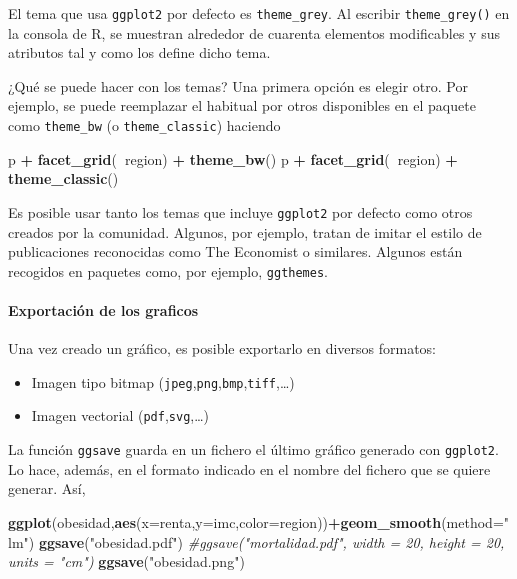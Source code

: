 \documentclass[]{article}
\newenvironment{Shaded}{\begin{snugshade}}{\end{snugshade}}
\newcommand{\CommentTok}[1]{\textcolor[rgb]{0.56,0.35,0.01}{\textit{#1}}}
\newcommand{\DataTypeTok}[1]{\textcolor[rgb]{0.13,0.29,0.53}{#1}}
\newcommand{\KeywordTok}[1]{\textcolor[rgb]{0.13,0.29,0.53}{\textbf{#1}}}
\newcommand{\NormalTok}[1]{#1}
\newcommand{\OperatorTok}[1]{\textcolor[rgb]{0.81,0.36,0.00}{\textbf{#1}}}
\newcommand{\StringTok}[1]{\textcolor[rgb]{0.31,0.60,0.02}{#1}}
\providecommand{\tightlist}{%
  \setlength{\itemsep}{0pt}\setlength{\parskip}{0pt}}
\let\oldparagraph\paragraph
\renewcommand{\paragraph}[1]{\oldparagraph{#1}\mbox{}}
\numberwithin{ejcnt}{section}
\begin{document}
El tema que usa \texttt{ggplot2} por defecto es \texttt{theme\_grey}. Al escribir \texttt{theme\_grey()} en la consola de R, se muestran alrededor de cuarenta elementos modificables y sus atributos tal y como los define dicho tema.

¿Qué se puede hacer con los temas? Una primera opción es elegir otro. Por ejemplo, se puede reemplazar el habitual por otros disponibles en el paquete como \texttt{theme\_bw} (o \texttt{theme\_classic}) haciendo

\begin{Shaded}
\begin{Highlighting}[]
\NormalTok{p }\OperatorTok{+}\StringTok{ }\KeywordTok{facet_grid}\NormalTok{(}\OperatorTok{~}\NormalTok{region) }\OperatorTok{+}\StringTok{ }\KeywordTok{theme_bw}\NormalTok{()}
\NormalTok{p }\OperatorTok{+}\StringTok{ }\KeywordTok{facet_grid}\NormalTok{(}\OperatorTok{~}\NormalTok{region) }\OperatorTok{+}\StringTok{ }\KeywordTok{theme_classic}\NormalTok{()}
\end{Highlighting}
\end{Shaded}

Es posible usar tanto los temas que incluye \texttt{ggplot2} por defecto como otros creados por la comunidad. Algunos, por ejemplo, tratan de imitar el estilo de publicaciones reconocidas como The Economist o similares. Algunos están recogidos en paquetes como, por ejemplo, \texttt{ggthemes}.

\hypertarget{exportacion-de-los-graficos}{%
\paragraph{Exportación de los graficos}\label{exportacion-de-los-graficos}}

Una vez creado un gráfico, es posible exportarlo en diversos formatos:

\begin{itemize}
\tightlist
\item
  Imagen tipo bitmap (\texttt{jpeg},\texttt{png},\texttt{bmp},\texttt{tiff},\ldots)
\item
  Imagen vectorial (\texttt{pdf},\texttt{svg},\ldots)
\end{itemize}

La función \texttt{ggsave} guarda en un fichero el último gráfico generado con \texttt{ggplot2}. Lo hace, además, en el formato indicado en el nombre del fichero que se quiere generar. Así,

\begin{Shaded}
\begin{Highlighting}[]
\KeywordTok{ggplot}\NormalTok{(obesidad,}\KeywordTok{aes}\NormalTok{(}\DataTypeTok{x=}\NormalTok{renta,}\DataTypeTok{y=}\NormalTok{imc,}\DataTypeTok{color=}\NormalTok{region))}\OperatorTok{+}\KeywordTok{geom_smooth}\NormalTok{(}\DataTypeTok{method=}\StringTok{"lm"}\NormalTok{)}
\KeywordTok{ggsave}\NormalTok{(}\StringTok{"obesidad.pdf"}\NormalTok{)}
\CommentTok{#ggsave("mortalidad.pdf", width = 20, height = 20, units = "cm")}
\KeywordTok{ggsave}\NormalTok{(}\StringTok{"obesidad.png"}\NormalTok{)}
\end{Highlighting}
\end{Shaded}
\end{document}
